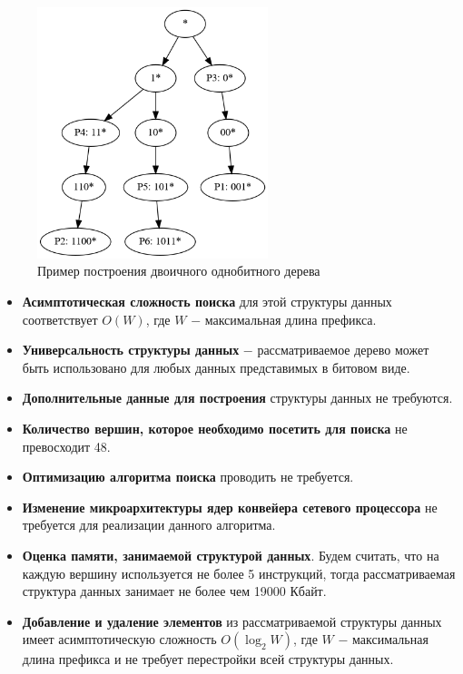 \documentclass[a4paper, 12pt, titlepage, finall]{extreport}
\begin{document}
            \begin{figure}[h]      
                \centering 
                \includegraphics[width=0.6\textwidth]{binary.png}
                \caption{Пример построения двоичного однобитного дерева}\label{fig:mesh1}
            \end{figure}
            
            \begin{itemize}
                \item\textbf{Асимптотическая сложность поиска} для этой структуры данных соответствует {\ttfamily $O(W)$},
                где {\ttfamily $W$} $-$ максимальная длина префикса.
                \item\textbf{Универсальность структуры данных} $-$ рассматриваемое дерево может быть использовано для любых данных представимых в битовом виде.
                \item\textbf{Дополнительные данные для построения} структуры данных не требуются.
                \item\textbf{Количество вершин, которое необходимо посетить для поиска} не превосходит 48.
                \item\textbf{Оптимизацию алгоритма поиска} проводить не требуется.
                \item\textbf{Изменение микроархитектуры ядер конвейера сетевого процессора} не требуется для реализации данного алгоритма.
                \item\textbf{Оценка памяти, занимаемой структурой данных}. Будем считать, что на каждую вершину используется не более 5 инструкций,
                тогда рассматриваемая структура данных занимает не более чем 19000 Кбайт.
                \item\textbf{Добавление и удаление элементов} из рассматриваемой структуры данных имеет асимптотическую сложность 
            {\ttfamily $O(\log_2{W})$}, где {\ttfamily $W$} $-$ максимальная длина префикса и не требует перестройки всей структуры данных.\\
            \end{itemize}
\end{document}
